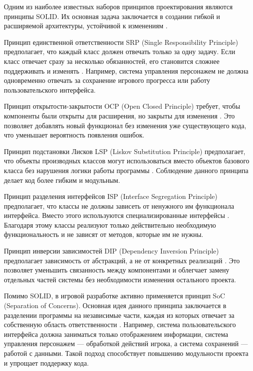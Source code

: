 \documentclass[a4paper,12pt]{report}
\begin{document}
Одним из наиболее известных наборов принципов проектирования являются принципы \acrshort{SOLID}. Их основная задача заключается в создании гибкой и расширяемой архитектуры, устойчивой к изменениям \cite{vishwakarma2025}.

Принцип единственной ответственности \acrshort{SRP} (Single Responsibility Principle) предполагает, что каждый класс должен отвечать только за одну задачу. Если класс отвечает сразу за несколько обязанностей, его становится сложнее поддерживать и изменять \cite{lin_style_guide}. Например, система управления персонажем не должна одновременно отвечать за сохранение игрового прогресса или работу пользовательского интерфейса.

Принцип открытости-закрытости \acrshort{OCP} (Open Closed Principle) требует, чтобы компоненты были открыты для расширения, но закрыты для изменения \cite{lin_patterns}. Это позволяет добавлять новый функционал без изменения уже существующего кода, что уменьшает вероятность появления ошибок.

Принцип подстановки Лисков \acrshort{LSP} (Liskov Substitution Principle) предполагает, что объекты производных классов могут использоваться вместо объектов базового класса без нарушения логики работы программы \cite{lin_patterns}. Соблюдение данного принципа делает код более гибким и модульным.

Принцип разделения интерфейсов \acrshort{ISP} (Interface Segregation Principle) предполагает, что классы не должны зависеть от ненужного им функционала интерфейса. Вместо этого используются специализированные интерфейсы \cite{lin_patterns}. Благодаря этому классы реализуют только действительно необходимую функциональность и не зависят от методов, которые им не нужны.

Принцип инверсии зависимостей \acrshort{DIP} (Dependency Inversion Principle) предполагает зависимость от абстракций, а не от конкретных реализаций \cite{lin_patterns}. Это позволяет уменьшить связанность между компонентами и облегчает замену отдельных частей системы без необходимости изменения остального проекта.

Помимо \acrshort{SOLID}, в игровой разработке активно применяется принцип \acrshort{SoC} (Separation of Concerns). Основная идея данного принципа заключается в разделении программы на независимые части, каждая из которых отвечает за собственную область ответственности \cite{lin_patterns}. Например, система пользовательского интерфейса должна заниматься только отображением информации, система управления персонажем --- обработкой действий игрока, а система сохранений --- работой с данными. Такой подход способствует повышению модульности проекта и упрощает поддержку кода.
\end{document}
